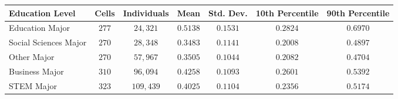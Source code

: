 \begin{tabular}{lcccccc}
\toprule
Education Level&Cells&Individuals&Mean&Std. Dev.&10th Percentile&90th Percentile\tabularnewline
\midrule
Education Major&$277$&$ 24,321$&$0.5138$&$0.1531$&$0.2824$&$0.6970$\tabularnewline
Social Sciences Major&$270$&$ 28,348$&$0.3483$&$0.1141$&$0.2008$&$0.4897$\tabularnewline
Other Major&$270$&$ 57,967$&$0.3505$&$0.1044$&$0.2082$&$0.4704$\tabularnewline
Business Major&$310$&$ 96,094$&$0.4258$&$0.1093$&$0.2601$&$0.5392$\tabularnewline
STEM Major&$323$&$109,439$&$0.4025$&$0.1104$&$0.2356$&$0.5174$\tabularnewline
\bottomrule
\end{tabular}
